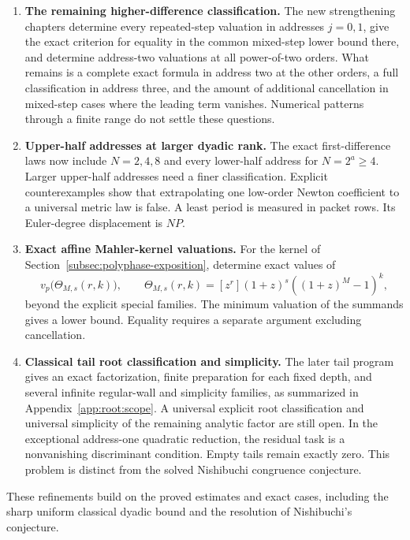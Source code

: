 \begin{enumerate}
\item \textbf{The remaining higher-difference classification.}
The new strengthening chapters determine every repeated-step valuation in addresses $j=0,1$, give the exact criterion for equality in the common mixed-step lower bound there, and determine address-two valuations at all power-of-two orders. What remains is a complete exact formula in address two at the other orders, a full classification in address three, and the amount of additional cancellation in mixed-step cases where the leading term vanishes. Numerical patterns through a finite range do not settle these questions.

\item \textbf{Upper-half addresses at larger dyadic rank.}
The exact first-difference laws now include $N=2,4,8$ and every lower-half address for $N=2^a\ge4$. Larger upper-half addresses need a finer classification. Explicit counterexamples show that extrapolating one low-order Newton coefficient to a universal metric law is false. A least period is measured in packet rows. Its Euler-degree displacement is $NP$.

\item \textbf{Exact affine Mahler-kernel valuations.}
For the kernel of Section~\ref{subsec:polyphase-exposition}, determine exact
values of
\[
v_p\bigl(\Theta_{M,s}(r,k)\bigr),\qquad
\Theta_{M,s}(r,k)=[z^r](1+z)^s((1+z)^M-1)^k,
\]
beyond the explicit special families. The minimum valuation of the summands
gives a lower bound. Equality requires a separate argument excluding
cancellation.

\item \textbf{Classical tail root classification and simplicity.}
The later tail program gives an exact factorization, finite preparation for each fixed depth, and several infinite regular-wall and simplicity families, as summarized in Appendix~\ref{app:root:scope}. A universal explicit root classification and universal simplicity of the remaining analytic factor are still open. In the exceptional address-one quadratic reduction, the residual task is a nonvanishing discriminant condition. Empty tails remain exactly zero. This problem is distinct from the solved Nishibuchi congruence conjecture.
\end{enumerate}

These refinements build on the proved estimates and exact cases, including
the sharp uniform classical dyadic bound and the resolution of Nishibuchi's
conjecture.

